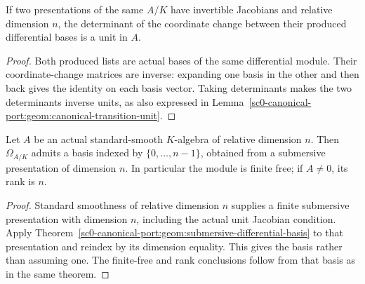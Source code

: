 \begin{lemma}
\label{sc0-canonical-port:geom:jacobian-transition-unit}
\leanok
If two presentations of the same \(A/K\) have invertible
Jacobians and relative dimension \(n\), the determinant of
the coordinate change between their produced differential bases
is a unit in \(A\).
\end{lemma}
\begin{proof}
Both produced lists are actual bases of the same differential
module. Their coordinate-change matrices are inverse: expanding
one basis in the other and then back gives the identity on each
basis vector. Taking determinants makes the two determinants
inverse units, as also expressed in
Lemma~\ref{sc0-canonical-port:geom:canonical-transition-unit}.
\end{proof}

\begin{theorem}
\label{sc0-canonical-port:geom:standard-smooth-differential-basis}
\leanok
Let \(A\) be an actual standard-smooth \(K\)-algebra of
relative dimension \(n\). Then \(\Omega_{A/K}\) admits a
basis indexed by \(\{0,\ldots,n-1\}\), obtained from a
submersive presentation of dimension \(n\).
In particular the module is finite free; if \(A\ne0\),
its rank is \(n\).
\end{theorem}
\begin{proof}
Standard smoothness of relative dimension \(n\) supplies a
finite submersive presentation with dimension \(n\), including
the actual unit Jacobian condition. Apply
Theorem~\ref{sc0-canonical-port:geom:submersive-differential-basis} to that
presentation and reindex by its dimension equality. This gives
the basis rather than assuming one. The finite-free and rank
conclusions follow from that basis as in the same theorem.
\end{proof}

